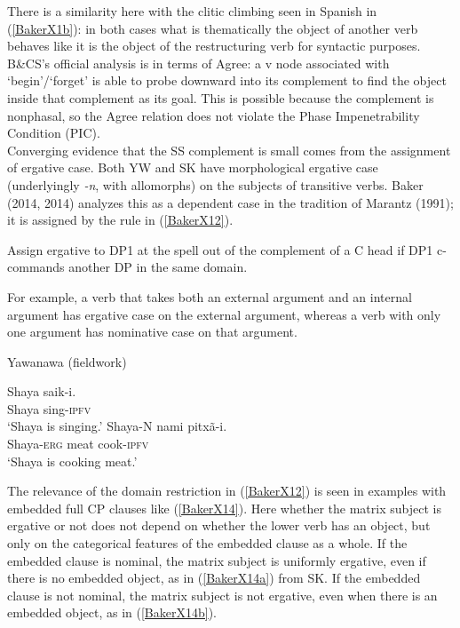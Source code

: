 \documentclass[output=paper,colorlinks,citecolor=brown,
]{langscibook}
\renewcommand{\sc}[1]{\textsc{#1}}
\begin{document}
There is a similarity here with the clitic climbing seen in Spanish in (\ref{BakerX1b}): in both cases what is thematically the object of another verb behaves like it is the object of the restructuring verb for syntactic purposes. B\&CS’s official analysis is in terms of Agree: a v node associated with ‘begin’/‘forget’ is able to probe downward into its complement to find the object inside that complement as its goal. This is possible because the complement is nonphasal, so the Agree relation does not violate the Phase Impenetrability Condition (PIC).\\

Converging evidence that the SS complement is small comes from the assignment of ergative case. Both YW and SK have morphological ergative case (underlyingly \textit{-n}, with allomorphs) on the subjects of transitive verbs. Baker (2014, 2014) analyzes this as a dependent case in the tradition of Marantz (1991); it is assigned by the rule in (\ref{BakerX12}).

\begin{exe}
    \ex \label{BakerX12} Assign ergative to DP1 at the spell out of the complement of a C head if DP1 c-commands another DP in the same domain.
\end{exe}

For example, a verb that takes both an external argument and an internal argument has ergative case on the external argument, whereas a verb with only one argument has nominative case on that argument.
\newpage
\begin{exe}
    \ex Yawanawa (fieldwork) \label{BakerX13}
        \begin{xlist}
        \ex \label{BakerX13a}
			\gll Shaya saik-i.\\
    			 Shaya sing-\sc{ipfv}\\
			    \glt `Shaya is singing.'
		\ex \label{BakerX13b}
			\gll Shaya-N nami pitxã-i.\\
    			 Shaya-\sc{erg} meat cook-\sc{ipfv}\\
			    \glt `Shaya is cooking meat.'
        \end{xlist}
\end{exe}

The relevance of the domain restriction in (\ref{BakerX12}) is seen in examples with embedded full CP clauses like (\ref{BakerX14}). Here whether the matrix subject is ergative or not does not depend on whether the lower verb has an object, but only on the categorical features of the embedded clause as a whole. If the embedded clause is nominal, the matrix subject is uniformly ergative, even if there is no embedded object, as in (\ref{BakerX14a}) from SK. If the embedded clause is not nominal, the matrix subject is not ergative, even when there is an embedded object, as in (\ref{BakerX14b}).
\end{document}
